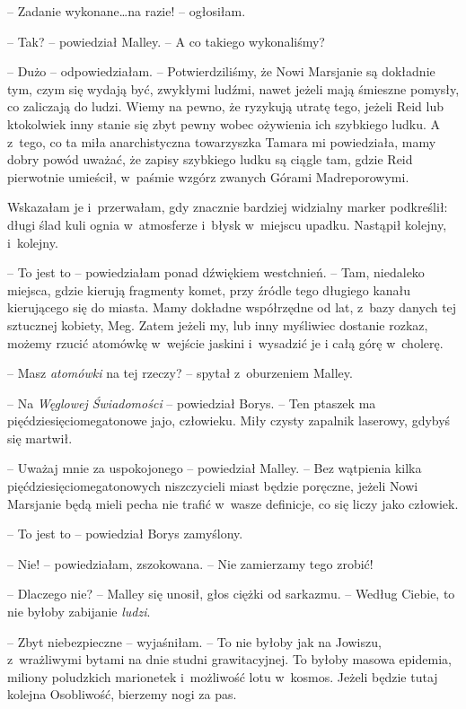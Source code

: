\documentclass[oneside,polish,11pt,sfheadings]{mwbk}
\begin{document}
-- Zadanie wykonane\ldots  na razie! -- ogłosiłam.

-- Tak? -- powiedział Malley. -- A co takiego wykonaliśmy?

-- Dużo -- odpowiedziałam. -- Potwierdziliśmy, że Nowi Marsjanie są
dokładnie tym, czym się wydają być, zwykłymi ludźmi, nawet jeżeli mają
śmieszne pomysły, co zaliczają do ludzi. Wiemy na pewno, że ryzykują
utratę tego, jeżeli Reid lub ktokolwiek inny stanie się zbyt pewny wobec
ożywienia ich szybkiego ludku. A z~tego, co ta miła anarchistyczna
towarzyszka Tamara mi powiedziała, mamy dobry powód uważać, że zapisy
szybkiego ludku są ciągle tam, gdzie Reid pierwotnie umieścił, w~paśmie
wzgórz zwanych Górami Madreporowymi.

Wskazałam je i~przerwałam, gdy znacznie bardziej widzialny marker
podkreślił: długi ślad kuli ognia w~atmosferze i~błysk w~miejscu upadku.
Nastąpił kolejny, i~kolejny.

-- To jest to -- powiedziałam ponad dźwiękiem westchnień. -- Tam, niedaleko
miejsca, gdzie kierują fragmenty komet, przy źródle tego długiego kanału
kierującego się do miasta. Mamy dokładne współrzędne od lat, z~bazy
danych tej sztucznej kobiety, Meg. Zatem jeżeli my, lub inny myśliwiec
dostanie rozkaz, możemy rzucić atomówkę w~wejście jaskini i~wysadzić je
i całą górę w~cholerę.

-- Masz \textit{atomówki} na tej rzeczy? -- spytał z~oburzeniem Malley.

-- Na \textit{Węglowej Świadomości} -- powiedział Borys. -- Ten ptaszek ma
pięćdziesięciomegatonowe jajo, człowieku. Miły czysty zapalnik laserowy,
gdybyś się martwił.

-- Uważaj mnie za uspokojonego -- powiedział Malley. -- Bez wątpienia kilka
pięćdziesięciomegatonowych niszczycieli miast będzie poręczne, jeżeli
Nowi Marsjanie będą mieli pecha nie trafić w~wasze definicje, co się
liczy jako człowiek.

-- To jest to -- powiedział Borys zamyślony.

-- Nie! -- powiedziałam, zszokowana. -- Nie zamierzamy tego zrobić!

-- Dlaczego nie? -- Malley się unosił, głos ciężki od sarkazmu. -- Według
Ciebie, to nie byłoby zabijanie \textit{ludzi}.

-- Zbyt niebezpieczne -- wyjaśniłam. -- To nie byłoby jak na Jowiszu, z~wrażliwymi bytami na dnie studni grawitacyjnej. To byłoby masowa
epidemia, miliony poludzkich marionetek i~możliwość lotu w~kosmos.
Jeżeli będzie tutaj kolejna Osobliwość, bierzemy nogi za pas.
\end{document}
